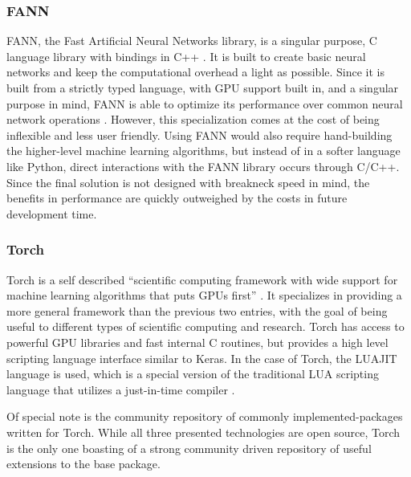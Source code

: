 \documentclass[draftclsnofoot,onecolumn,letterpaper,10pt]{IEEEtran}
\begin{document}
\subsubsection{FANN}
FANN, the Fast Artificial Neural Networks library, is a singular purpose, C language library with bindings in C++ \cite{fann}.
It is built to create basic neural networks and keep the computational overhead a light as possible.
Since it is built from a strictly typed language, with GPU support built in, and a singular purpose in mind, FANN is able to optimize its performance over common neural network operations \cite{fann}.
However, this specialization comes at the cost of being inflexible and less user friendly.
Using FANN would also require hand-building the higher-level machine learning algorithms, but instead of in a softer language like Python, direct interactions with the FANN library occurs through C/C++.
Since the final solution is not designed with breakneck speed in mind, the benefits in performance are quickly outweighed by the costs in future development time.

\subsubsection{Torch}
Torch is a self described ``scientific computing framework with wide support for machine learning algorithms that puts GPUs first'' \cite{torch}.
It specializes in providing a more general framework than the previous two entries, with the goal of being useful to different types of scientific computing and research.
Torch has access to powerful GPU libraries and fast internal C routines, but provides a high level scripting language interface similar to Keras.
In the case of Torch, the LUAJIT language is used, which is a special version of the traditional LUA scripting language that utilizes a just-in-time compiler \cite{torch}.

Of special note is the community repository of commonly implemented-packages written for Torch.
While all three presented technologies are open source, Torch is the only one boasting of a strong community driven repository of useful extensions to the base package.
\end{document}
